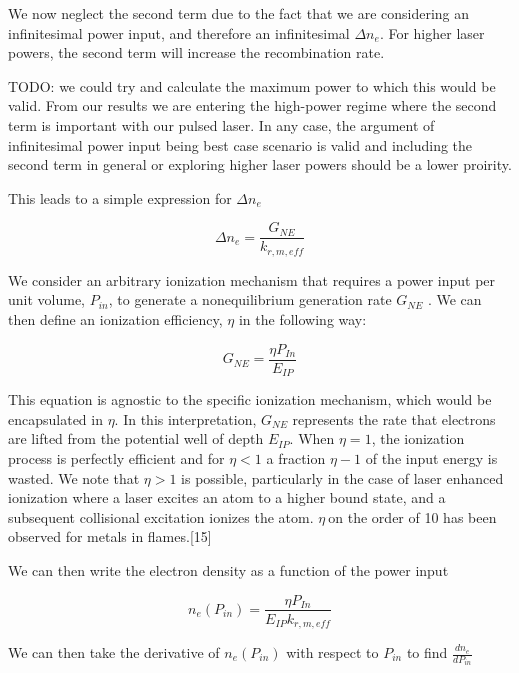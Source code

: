 We now neglect the second term due to the fact that we are considering an infinitesimal power input, and therefore an infinitesimal $\Delta n_{e}$. For higher laser powers, the second term will increase the recombination rate. 

TODO: we could try and calculate the maximum power to which this would be valid. From our results we are entering the high-power regime where the second term is important with our pulsed laser. In any case, the argument of infinitesimal power input being best case scenario is valid and including the second term in general or exploring higher laser powers should be a lower proirity.

This leads to a simple expression for $\Delta n_{e}$

\begin{equation}
\Delta n_{e} = \frac{G_{NE}}{k_{r, m, eff}}
\end{equation}


We consider an arbitrary ionization mechanism that requires a power input per unit volume, \(P_{in}\), to generate a nonequilibrium generation rate \(G_{NE}\) . We can then define an ionization efficiency, \(\eta\) in the following way:

\begin{equation}
{G}_{NE} = \frac{\eta P_{In}}{E_{IP}}
\end{equation}


This equation is agnostic to the specific ionization mechanism, which would be encapsulated in \(\eta\). In this interpretation, \(G_{NE}\) represents the rate that electrons are lifted from the potential well of depth \(E_{IP}\). When \(\eta = 1\), the ionization process is perfectly efficient and for \(\eta < 1\) a fraction \(\eta - 1\) of the input energy is wasted. We note that \(\eta > 1\) is possible, particularly in the case of laser enhanced ionization where a laser excites an atom to a higher bound state, and a subsequent collisional excitation ionizes the atom. \(\eta\ \)on the order of 10 has been observed for metals in flames.{[}15{]} 

We can then write the electron density as a function of the power input

\begin{equation}
n_{e}(P_{in}) = \frac{\eta P_{In}}{E_{IP}k_{r, m, eff}}
\end{equation}

We can then take the derivative of $n_{e}(P_{in})$ with respect to $P_{in}$ to find $\frac{dn_{e}}{dP_{in}}$

